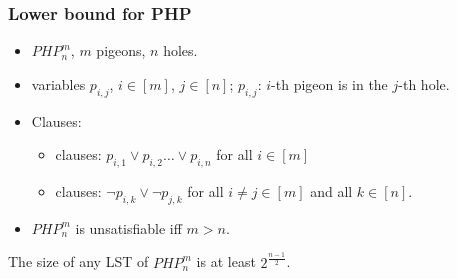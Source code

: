 \begin{frame}
    \frametitle{Lower bound for PHP}

    \begin{itemize}
		\item $PHP^m_n$, $m$ pigeons, $n$ holes. 
		\item variables $p_{i, j}$, $i \in [m]$, $j \in [n]$; 
			$p_{i, j}$: $i$-th pigeon is in the $j$-th hole.
		\item Clauses: 
			\begin{itemize}
				\item {} clauses: $p_{i, 1} \lor p_{i, 2} \dots
		            \lor p_{i, n}$ for all $i \in [m]$ 
				\item {} clauses: $\lnot p_{i, k} \lor \lnot
            		p_{j, k}$ for all $i \neq j \in [m]$ and all $k \in [n]$.
			\end{itemize}
		\item $PHP^m_n$ is unsatisfiable iff $m > n$.

	\end{itemize}
    
	\pause

    \begin{theorem}
        The size of any LST of $PHP^m_n$ is at least $2^{\frac{n - 1}{2}}$.
    \end{theorem}

\end{frame}







